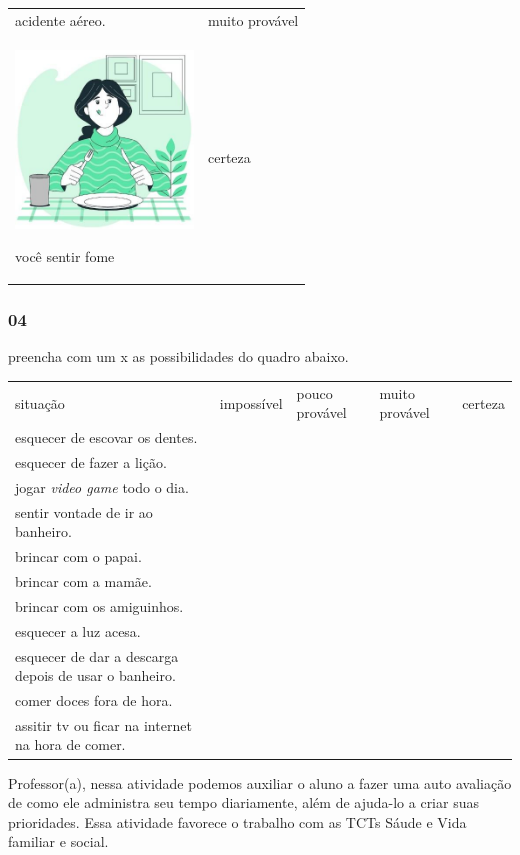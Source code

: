 \begin{longtable}[]{@{}ll@{}}
\begin{minipage}[t]{0.48\columnwidth}
acidente aéreo.\strut
\end{minipage} & \begin{minipage}[t]{0.48\columnwidth}\raggedright\strut
muito provável\strut
\end{minipage}\tabularnewline
\begin{minipage}[t]{0.48\columnwidth}\raggedright\strut
\includegraphics[width=1.86458in,height=1.86458in]{media/image85.jpg}

você sentir fome\strut
\end{minipage} & \begin{minipage}[t]{0.48\columnwidth}\raggedright\strut
certeza\strut
\end{minipage}\tabularnewline
\bottomrule
\end{longtable}

\subsubsection{04}\label{section-66}

preencha com um x as possibilidades do quadro abaixo.

\begin{longtable}[]{@{}lllll@{}}
\toprule
situação & impossível & pouco provável & muito provável &
certeza\tabularnewline
esquecer de escovar os dentes. & & & &\tabularnewline
esquecer de fazer a lição. & & & &\tabularnewline
jogar \emph{video game} todo o dia. & & & &\tabularnewline
sentir vontade de ir ao banheiro. & & & &\tabularnewline
brincar com o papai. & & & &\tabularnewline
brincar com a mamãe. & & & &\tabularnewline
brincar com os amiguinhos. & & & &\tabularnewline
esquecer a luz acesa. & & & &\tabularnewline
esquecer de dar a descarga depois de usar o banheiro. & & &
&\tabularnewline
comer doces fora de hora. & & & &\tabularnewline
assitir tv ou ficar na internet na hora de comer. & & & &\tabularnewline
\bottomrule
\end{longtable}

Professor(a), nessa atividade podemos auxiliar o aluno a fazer uma auto
avaliação de como ele administra seu tempo diariamente, além de ajuda-lo
a criar suas prioridades. Essa atividade favorece o trabalho com as TCTs
Sáude e Vida familiar e social.

